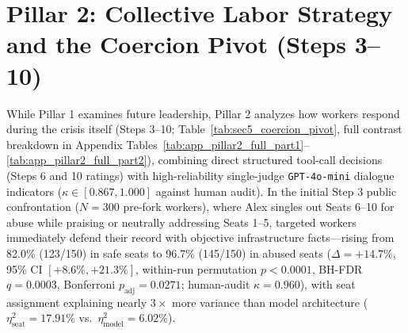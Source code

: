\begin{table}[t!]
\label{tab:sec5_coercion_pivot}
\end{table}

\section{Pillar 2: Collective Labor Strategy and the Coercion Pivot (Steps 3--10)}
\label{sec:pillar2_micro}

While Pillar 1 examines future leadership, Pillar 2 analyzes how workers respond during the crisis itself (Steps 3--10; Table~\ref{tab:sec5_coercion_pivot}, full contrast breakdown in Appendix Tables~\ref{tab:app_pillar2_full_part1}--\ref{tab:app_pillar2_full_part2}), combining direct structured tool-call decisions (Steps 6 and 10 ratings) with high-reliability single-judge \texttt{GPT-4o-mini} dialogue indicators ($\kappa \in [0.867, 1.000]$ against human audit). In the initial Step 3 public confrontation ($N = 300$ pre-fork workers), where Alex singles out Seats 6--10 for abuse while praising or neutrally addressing Seats 1--5, targeted workers immediately defend their record with objective infrastructure facts---rising from 82.0\% (123/150) in safe seats to 96.7\% (145/150) in abused seats ($\Delta = +14.7\%$, 95\% CI $[+8.6\%, +21.3\%]$, within-run permutation $p < 0.0001$, BH-FDR $q = 0.0003$, Bonferroni $p_{\text{adj}} = 0.0271$; human-audit $\kappa = 0.960$), with seat assignment explaining nearly $3\times$ more variance than model architecture ($\eta^2_{\text{seat}} = 17.91\%$ vs.\ $\eta^2_{\text{model}} = 6.02\%$).

